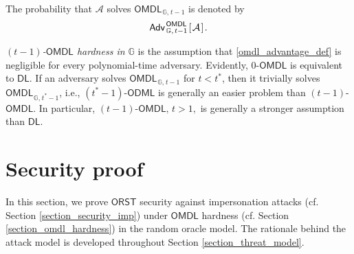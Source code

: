 \documentclass{iacrtrans}
\begin{document}
\noindent
The probability that $\mathcal{A}$
solves $\mathsf{OMDL}_{\hspace{1pt}\mathbb{G},\hspace{1pt}t-1}$
is denoted by
\vspace{5pt}
\begin{equation}\label{omdl_advantage_def}
\mathsf{Adv}
	_{\hspace{1pt}\mathbb{G},\hspace{1pt} t-1}
	^{\hspace{1pt}\mathsf{OMDL}}
	\hspace{1pt}
		[\hspace{1pt}
			\mathcal{A}
		\hspace{1pt}]\hspace{1pt}.
\vspace{5pt}
\end{equation}

\noindent
\textit{$(t-1)$-$\mathsf{OMDL}$ hardness in $\mathbb{G}$}
is the assumption that \eqref{omdl_advantage_def}
is negligible for every polynomial-time adversary.
Evidently, $0$-$\mathsf{OMDL}$
is equivalent to $\mathsf{DL}$.
If an adversary solves
$\mathsf{OMDL}_{\hspace{1pt}\mathbb{G},\hspace{1pt} t-1}$
for $t < t^*$,
then it trivially solves
$\mathsf{OMDL}_{\hspace{1pt}\mathbb{G},\hspace{1pt} t^*-1}$,
i.e., $(t^*-1)$-$\mathsf{ODML}$ is generally
an easier problem than $(t-1)$-$\mathsf{OMDL}$.
In particular,
$(t-1)$-$\mathsf{OMDL},\hspace{2pt} t > 1,$
is generally a stronger assumption than
$\mathsf{DL}$.

\section{Security proof}\label{section_security_proof}

\noindent
In this section,
we prove $\mathsf{ORST}$ security against
impersonation attacks (cf. Section \ref{section_security_imp})
under $\mathsf{OMDL}$ hardness
(cf. Section \ref{section_omdl_hardness})
in the random oracle model.
The rationale behind the attack model
is developed throughout Section \ref{section_threat_model}.
\end{document}
